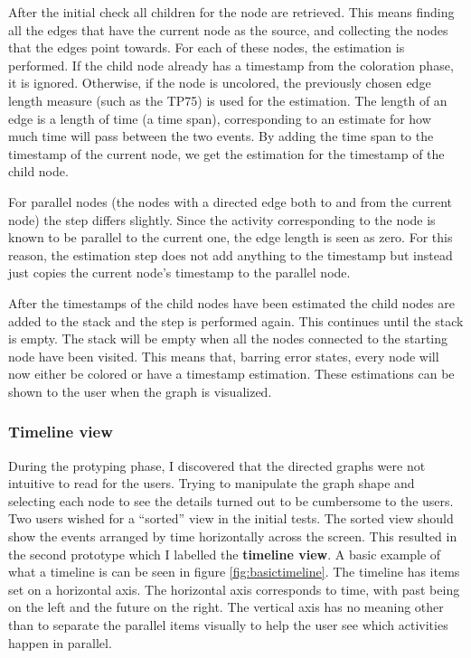 After the initial check all children for the node are retrieved.
This means finding all the edges that have the current node as the source, and collecting the nodes that the edges point towards.
For each of these nodes, the estimation is performed.
If the child node already has a timestamp from the coloration phase, it is ignored.
Otherwise, if the node is uncolored, the previously chosen edge length measure (such as the TP75) is used for the estimation. 
The length of an edge is a length of time (a time span), corresponding to an estimate for how much time will pass between the two events.
By adding the time span to the timestamp of the current node, we get the estimation for the timestamp of the child node.

For parallel nodes (the nodes with a directed edge both to and from the current node) the step differs slightly. 
Since the activity corresponding to the node is known to be parallel to the current one, the edge length is seen as zero.
For this reason, the estimation step does not add anything to the timestamp but instead just copies the current node's timestamp to the parallel node.

After the timestamps of the child nodes have been estimated the child nodes are added to the stack and the step is performed again.
This continues until the stack is empty.
The stack will be empty when all the nodes connected to the starting node have been visited.
This means that, barring error states, every node will now either be colored or have a timestamp estimation.
These estimations can be shown to the user when the graph is visualized.

\subsubsection{Timeline view}

During the protyping phase, I discovered that the directed graphs were not intuitive to read for the users.
Trying to manipulate the graph shape and selecting each node to see the details turned out to be cumbersome to the users.
Two users wished for a ``sorted'' view in the initial tests.
The sorted view should show the events arranged by time horizontally across the screen.
This resulted in the second prototype which I labelled the \textbf{timeline view}.
A basic example of what a timeline is can be seen in figure \ref{fig:basictimeline}.
The timeline has items set on a horizontal axis.
The horizontal axis corresponds to time, with past being on the left and the future on the right.
The vertical axis has no meaning other than to separate the parallel items visually to help the user see which activities happen in parallel.

